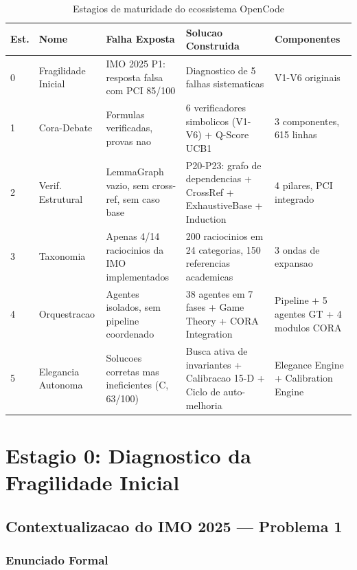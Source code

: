 \documentclass[5p]{elsarticle}
\begin{document}
\begin{table}[H]
  \centering
  \caption{Estagios de maturidade do ecossistema OpenCode}
  \label{tab:stages}
  \small
  \begin{tabular}{p{0.6cm}p{2.2cm}p{3.5cm}p{4.2cm}p{3.5cm}}
    \toprule
    \textbf{Est.} & \textbf{Nome} & \textbf{Falha Exposta} & \textbf{Solucao Construida} & \textbf{Componentes} \\
    \midrule
    0 & Fragilidade Inicial & IMO 2025 P1: resposta falsa com PCI 85/100 & Diagnostico de 5 falhas sistematicas & V1-V6 originais \\
    \rowcolor{redbg}
    1 & Cora-Debate & Formulas verificadas, provas nao & 6 verificadores simbolicos (V1-V6) + Q-Score UCB1 & 3 componentes, 615 linhas \\
    2 & Verif. Estrutural & LemmaGraph vazio, sem cross-ref, sem caso base & P20-P23: grafo de dependencias + CrossRef + ExhaustiveBase + Induction & 4 pilares, PCI integrado \\
    \rowcolor{yellowbg}
    3 & Taxonomia & Apenas 4/14 raciocinios da IMO implementados & 200 raciocinios em 24 categorias, 150 referencias academicas & 3 ondas de expansao \\
    4 & Orquestracao & Agentes isolados, sem pipeline coordenado & 38 agentes em 7 fases + Game Theory + CORA Integration & Pipeline + 5 agentes GT + 4 modulos CORA \\
    \rowcolor{greenbg}
    5 & Elegancia Autonoma & Solucoes corretas mas ineficientes (C, 63/100) & Busca ativa de invariantes + Calibracao 15-D + Ciclo de auto-melhoria & Elegance Engine + Calibration Engine \\
    \bottomrule
  \end{tabular}
\end{table}

\section{Estagio 0: Diagnostico da Fragilidade Inicial}

\subsection{Contextualizacao do IMO 2025 — Problema 1}

\subsubsection{Enunciado Formal}
\end{document}
